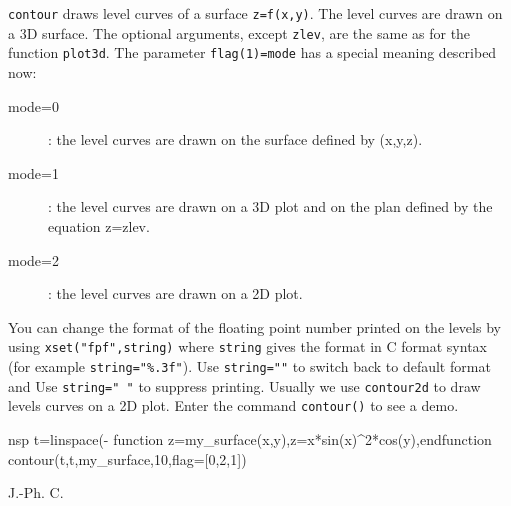 \begin{mandescription}
  \verb!contour! draws level curves of a surface \verb!z=f(x,y)!. The level curves are
  drawn on a 3D surface. The optional arguments, except \verb!zlev!, are the same as
  for the function \verb!plot3d!. The parameter \verb!flag(1)=mode! has a special meaning
  described now:
  \begin{description}
  \item[mode=0] : the level curves are drawn on the surface defined by (x,y,z).
  \item[mode=1] : the level curves are drawn on a 3D plot and on the plan defined
    by  the equation z=zlev.
  \item[mode=2] : the level curves are drawn on a 2D plot.
  \end{description}

  You can change the format of the floating point number printed on the levels
  by using \verb!xset("fpf",string)! where \verb!string! gives the
  format in C format syntax (for example \verb!string="%.3f"!). Use
  \verb!string=""! to switch back to default format and Use
  \verb!string=" "! to suppress printing.
  Usually we use \verb!contour2d! to draw levels curves on a 2D plot.
  Enter the command \verb!contour()! to see a demo.
\end{mandescription}

\begin{examples}
  \begin{mintednsp}{nsp}
    t=linspace(-%
    function z=my_surface(x,y),z=x*sin(x)^2*cos(y),endfunction
    contour(t,t,my_surface,10,flag=[0,2,1])
  \end{mintednsp}
\end{examples}
\begin{manseealso}
   
\end{manseealso}
\begin{authors}
  J.-Ph. C.
\end{authors}
